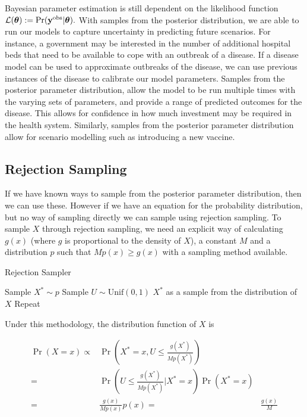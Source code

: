 Bayesian parameter estimation is still dependent on the likelihood function
$\mathcal{L}(\bm{\theta}) := \Pr(\mathbf{y}^{\mathrm{obs}}|\bm{\theta}).$
With samples from the posterior distribution, we are
able to run our models to capture uncertainty in predicting future scenarios.
For instance, a government may be interested in the number of additional
hospital beds that need to be available to cope with an outbreak of a disease.
If a disease model can be used to approximate outbreaks of the disease,
we can use previous instances of the disease to calibrate our model parameters.
Samples from the posterior parameter distribution, allow
the model to be run multiple times with the varying sets of parameters,
and provide a range of predicted outcomes for the disease. This allows for
confidence in how much investment may be required in the health system.
Similarly, samples from the posterior parameter distribution allow for scenario
modelling such as introducing a new vaccine.

\subsection*{Rejection Sampling}

If we have known ways to sample from the posterior parameter distribution,
then we can use these. However if we have an equation for the probability
distribution, but no way of sampling directly we can sample using rejection
sampling. To sample $X$ through rejection sampling,
we need an explicit way of calculating
$g(x)$ (where $g$ is proportional to the density of $X$), a constant $M$ and
a distribution $p$ such that $Mp(x) \geq g(x)$ with a sampling method
available.

\begin{algorithm}[htbp]
    \caption{Rejection Sampler}
    \label{alg:rej_samp}
    \begin{algorithmic}[1]
        \State Sample $X^\ast \sim p$
        \State Sample $U \sim \mathrm{Unif}(0, 1)$
        \State \Return $X^\ast$ as a sample from the distribution of $X$
        \Else
        \State Repeat
        \EndIf
    \end{algorithmic}
\end{algorithm}

Under this methodology, the distribution function of $X$ is

\begin{align*}
    \Pr(X = x)
    \propto & \Pr(X^\ast = x , U \leq \frac{g(X^\ast)}{M p(X^\ast)})
    \tag*{where the probabilities may be interpreted as densities}                   \\
    =       & \Pr(U \leq \frac{g(X^\ast)}{M p(X^\ast)} | X^\ast = x) \Pr(X^\ast = x) \\
    =       & \frac{g(x)}{M p(x)} p(x)
    =       & \frac{g(x)}{M}
\end{align*}

